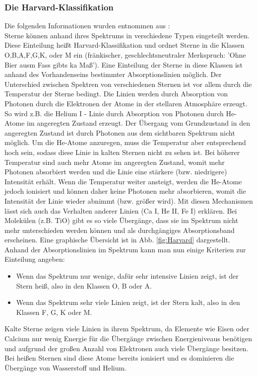 \subsubsection{Die Harvard-Klassifikation}
Die folgenden Informationen wurden entnommen aus \cite{ttunen}:\\
Sterne können anhand ihres Spektrums in verschiedene Typen eingeteilt werden. Diese Einteilung heißt Harvard-Klassifikation und ordnet Sterne in die Klassen O,B,A,F,G,K, oder M ein (fränkischer, geschlechtsneutraler Merkspruch: 'Ohne Bier ausm Fass gibts ka Maß'). Eine Einteilung der Sterne in diese Klassen ist anhand des Vorhandenseins bestimmter Absorptionslinien möglich. Der Unterschied zwischen Spektren von verschiedenen Sternen ist vor allem durch die Temperatur der Sterne bedingt. Die Linien werden durch Absorption von Photonen durch die Elektronen der Atome in der stellaren Atmosphäre erzeugt. So wird z.B. die Helium I - Linie durch Absorption von Photonen durch He-Atome im angeregten Zustand erzeugt. Der Übergang vom Grundzustand in den angeregten Zustand ist durch Photonen aus dem sichtbaren Spektrum nicht möglich. Um die He-Atome anzuregen, muss die Temperatur aber entsprechend hoch sein, sodass diese Linie in kalten Sternen nicht zu sehen ist. Bei höherer Temperatur sind auch mehr Atome im angeregten Zustand, womit mehr Photonen absorbiert werden und die Linie eine stärkere (bzw. niedrigere) Intensität erhält. Wenn die Temperatur weiter ansteigt, werden die He-Atome jedoch ionisiert und können daher keine Photonen mehr absorbieren, womit die Intensität der Linie wieder abnimmt (bzw. größer wird). Mit diesen Mechanismen lässt sich auch das Verhalten anderer Linien (Ca I, He II, Fe I) erklären. Bei Molekülen (z.B. TiO) gibt es so viele Übergänge, dass sie im Spektrum nicht mehr unterschieden werden können und als durchgängiges Absorptionsband erscheinen. Eine graphische Übersicht ist in Abb. \ref{fig:Harvard} dargestellt.
\\
Anhand der Absorptionslinien im Spektrum kann man nun einige Kriterien zur Einteilung angeben:
\begin{itemize}
\item Wenn das Spektrum nur wenige, dafür sehr intensive Linien zeigt, ist der Stern heiß, also in den Klassen O, B oder A.
\item Wenn das Spektrum sehr viele Linien zeigt, ist der Stern kalt, also in den Klassen F, G, K oder M.
\end{itemize}

Kalte Sterne zeigen viele Linien in ihrem Spektrum, da Elemente wie Eisen oder Calcium nur wenig Energie für die Übergänge zwischen Energieniveaus benötigen und aufgrund der großen Anzahl von Elektronen auch viele Übergänge besitzen. Bei heißen Sternen sind diese Atome bereits ionisiert und es dominieren die Übergänge von Wasserstoff und Helium.

